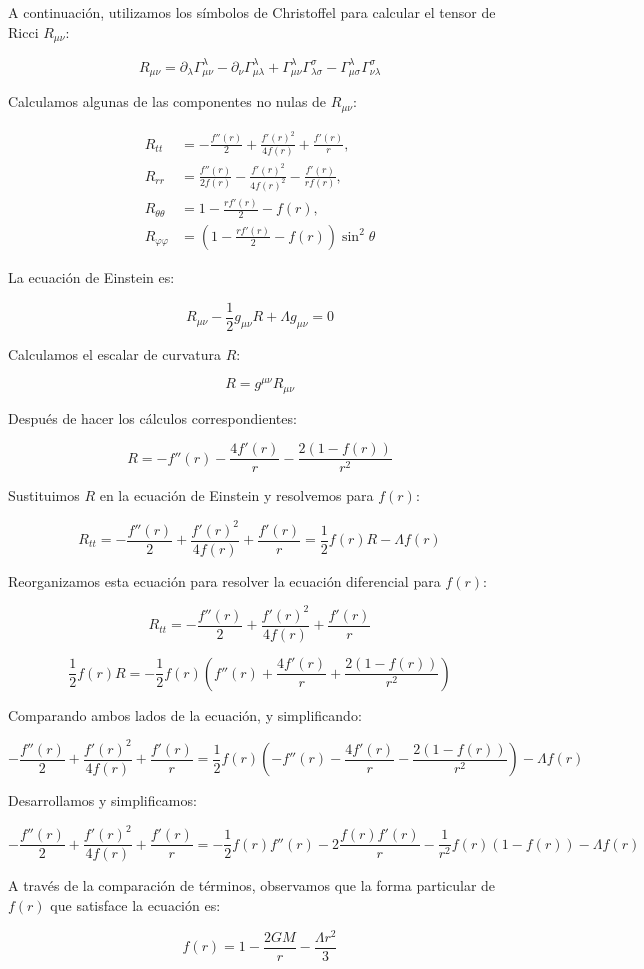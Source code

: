 \documentclass{article}
\begin{document}
A continuación, utilizamos los símbolos de Christoffel para calcular el tensor de Ricci \( R_{\mu\nu} \):

\[
R_{\mu\nu} = \partial_\lambda \Gamma^\lambda_{\mu\nu} - \partial_\nu \Gamma^\lambda_{\mu\lambda} + \Gamma^\lambda_{\mu\nu} \Gamma^\sigma_{\lambda\sigma} - \Gamma^\lambda_{\mu\sigma} \Gamma^\sigma_{\nu\lambda}
\]

Calculamos algunas de las componentes no nulas de \( R_{\mu\nu} \):

\[
\begin{aligned}
R_{tt} &= -\frac{f''(r)}{2} + \frac{f'(r)^2}{4f(r)} + \frac{f'(r)}{r}, \\
R_{rr} &= \frac{f''(r)}{2f(r)} - \frac{f'(r)^2}{4f(r)^2} - \frac{f'(r)}{r f(r)}, \\
R_{\theta\theta} &= 1 - \frac{r f'(r)}{2} - f(r), \\
R_{\varphi\varphi} &= \left( 1 - \frac{r f'(r)}{2} - f(r) \right) \sin^2 \theta
\end{aligned}
\]

La ecuación de Einstein es:

\[
R_{\mu\nu} - \frac{1}{2} g_{\mu\nu} R + \Lambda g_{\mu\nu} = 0
\]

Calculamos el escalar de curvatura \( R \):

\[
R = g^{\mu\nu} R_{\mu\nu}
\]

Después de hacer los cálculos correspondientes:

\[
R = -f''(r) - \frac{4 f'(r)}{r} - \frac{2 (1 - f(r))}{r^2}
\]

Sustituimos \( R \) en la ecuación de Einstein y resolvemos para \( f(r) \):

\[
R_{tt} = -\frac{f''(r)}{2} + \frac{f'(r)^2}{4f(r)} + \frac{f'(r)}{r} = \frac{1}{2} f(r) R - \Lambda f(r)
\]

Reorganizamos esta ecuación para resolver la ecuación diferencial para \( f(r) \):

\[
R_{tt} = -\frac{f''(r)}{2} + \frac{f'(r)^2}{4f(r)} + \frac{f'(r)}{r}
\]

\[
\frac{1}{2} f(r) R = -\frac{1}{2} f(r) \left( f''(r) + \frac{4 f'(r)}{r} + \frac{2 (1 - f(r))}{r^2} \right)
\]

Comparando ambos lados de la ecuación, y simplificando:

\[
-\frac{f''(r)}{2} + \frac{f'(r)^2}{4f(r)} + \frac{f'(r)}{r} = \frac{1}{2} f(r) \left( -f''(r) - \frac{4 f'(r)}{r} - \frac{2 (1 - f(r))}{r^2} \right) - \Lambda f(r)
\]

Desarrollamos y simplificamos:

\[
-\frac{f''(r)}{2} + \frac{f'(r)^2}{4f(r)} + \frac{f'(r)}{r} = -\frac{1}{2} f(r) f''(r) - 2 \frac{f(r) f'(r)}{r} - \frac{1}{r^2} f(r) (1 - f(r)) - \Lambda f(r)
\]

A través de la comparación de términos, observamos que la forma particular de \( f(r) \) que satisface la ecuación es:

\[
f(r) = 1 - \frac{2GM}{r} - \frac{\Lambda r^2}{3}
\]
\end{document}
